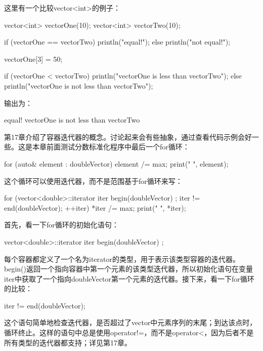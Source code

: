 这里有一个比较vector<int>的例子：

\begin{cpp}
vector<int> vectorOne(10);
vector<int> vectorTwo(10);

if (vectorOne == vectorTwo) { println("equal!"); }
else { println("not equal!"); }

vectorOne[3] = 50;

if (vectorOne < vectorTwo) { println("vectorOne is less than vectorTwo"); }
else { println("vectorOne is not less than vectorTwo"); }
\end{cpp}

输出为：

\begin{shell}
equal!
vectorOne is not less than vectorTwo
\end{shell}


第17章介绍了容器迭代器的概念。讨论起来会有些抽象，通过查看代码示例会好一些。这是本章前面测试分数标准化程序中最后一个for循环：

\begin{cpp}
for (auto& element : doubleVector) {
    element /= max;
    print("{} ", element);
}
\end{cpp}

这个循环可以使用迭代器，而不是范围基于for循环来写：

\begin{cpp}
for (vector<double>::iterator iter { begin(doubleVector) };
iter != end(doubleVector); ++iter) {
    *iter /= max;
    print("{} ", *iter);
}
\end{cpp}

首先，看一下for循环的初始化语句：

\begin{cpp}
vector<double>::iterator iter { begin(doubleVector) };
\end{cpp}

每个容器都定义了一个名为iterator的类型，用于表示该类型容器的迭代器。begin()返回一个指向容器中第一个元素的该类型迭代器，所以初始化语句在变量iter中获取了一个指向doubleVector第一个元素的迭代器。接下来，看一下for循环的比较：

\begin{cpp}
iter != end(doubleVector);
\end{cpp}

这个语句简单地检查迭代器，是否超过了vector中元素序列的末尾；到达该点时，循环终止。这样的语句中总是使用operator!=，而不是operator<，因为后者不是所有类型的迭代器都支持；详见第17章。

